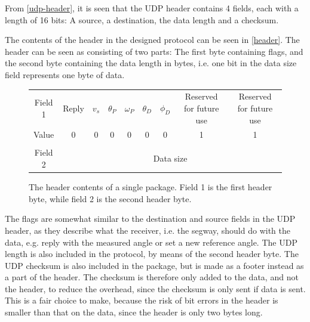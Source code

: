 From \autoref{udp-header}, it is seen that the UDP header contains 4 fields, each with a length of 16 bits: A source, a destination, the data length and a checksum. 

The contents of the header in the designed protocol can be seen in \autoref{header}. The header can be seen as consisting of two parts: The first byte containing flags, and the second byte containing the data length in bytes, i.e. one bit in the data size field represents one byte of data. \\

\begin{figure}[H]
\centering
\begin{tabular}{ccccccccc}
\cline{2-9}
Field 1 & \multicolumn{1}{|M{0.1\textwidth}|}{Reply} & \multicolumn{1}{M{0.05\textwidth}|}{$v_s$} & \multicolumn{1}{M{0.05\textwidth}|}{$\theta_P$} & \multicolumn{1}{M{0.05\textwidth}||}{$\omega_P$} & \multicolumn{1}{M{0.05\textwidth}|}{$\theta_D$} & \multicolumn{1}{M{0.05\textwidth}|}{$\phi_D$} & \multicolumn{1}{M{0.1\textwidth}|}{Reserved for future use} & \multicolumn{1}{M{0.1\textwidth}|}{Reserved for future use} \\ \cline{2-9}\cline{2-9}

Value&\multicolumn{1}{|M{0.1\textwidth}|}{0} & \multicolumn{1}{M{0.05\textwidth}|}{0} & \multicolumn{1}{M{0.05\textwidth}|}{0} & \multicolumn{1}{M{0.05\textwidth}||}{0} & \multicolumn{1}{M{0.05\textwidth}|}{0} & \multicolumn{1}{M{0.05\textwidth}|}{0} & \multicolumn{1}{M{0.1\textwidth}|}{1} & \multicolumn{1}{M{0.1\textwidth}|}{1} \\ \cline{2-9}
\\ \cline{2-9}
Field 2&\multicolumn{8}{|c|}{Data size}                                                                                                                                                                                                                                                                 \\ \cline{2-9}
\end{tabular}
\caption{The header contents of a single package. Field 1 is the first header byte, while field 2 is the second header byte.}
\label{header}
\end{figure}

The flags are somewhat similar to the destination and source fields in the UDP header, as they describe what the receiver, i.e. the segway, should do with the data, e.g. reply with the measured angle or set a new reference angle. The UDP length is also included in the protocol, by means of the second header byte. The UDP checksum is also included in the package, but is made as a footer instead as a part of the header. The checksum is therefore only added to the data, and not the header, to reduce the overhead, since the checksum is only sent if data is sent. This is a fair choice to make, because the risk of bit errors in the header is smaller than that on the data, since the header is only two bytes long.

